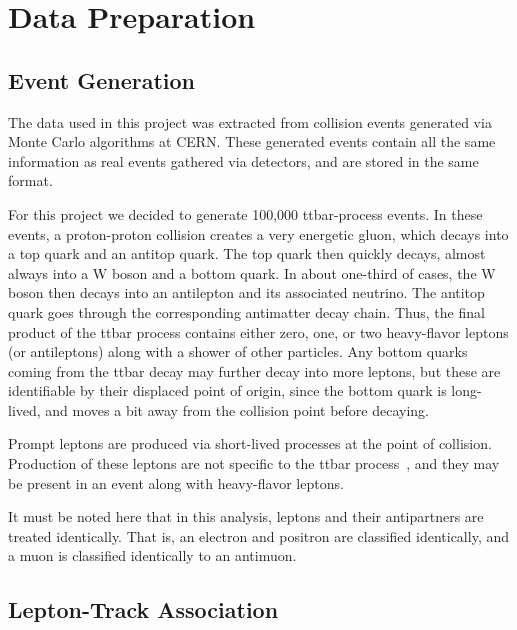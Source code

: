 \section{Data Preparation}\label{sec:dataprep}

\subsection{Event Generation}

The data used in this project was extracted from collision events generated via Monte Carlo algorithms at CERN. These generated events contain all the same information as real events gathered via detectors, and are stored in the same format.


For this project we decided to generate 100,000 ttbar-process events. In these events, a proton-proton collision creates a very energetic gluon, which decays into a top quark and an antitop quark. The top quark then quickly decays, almost always into a W boson and a bottom quark. In about one-third of cases, the W boson then decays into an antilepton and its associated neutrino. The antitop quark goes through the corresponding antimatter decay chain. Thus, the final product of the ttbar process contains either zero, one, or two heavy-flavor leptons (or antileptons) along with a shower of other particles. Any bottom quarks coming from the ttbar decay may further decay into more leptons, but these are identifiable by their displaced point of origin, since the bottom quark is long-lived, and moves a bit away from the collision point before decaying.

Prompt leptons are produced via short-lived processes at the point of collision. Production of these leptons are not specific to the ttbar process~\cite{bodek}, and they may be present in an event along with heavy-flavor leptons.

It must be noted here that in this analysis, leptons and their antipartners are treated identically. That is, an electron and positron are classified identically, and a muon is classified identically to an antimuon.


\subsection{Lepton-Track Association}

